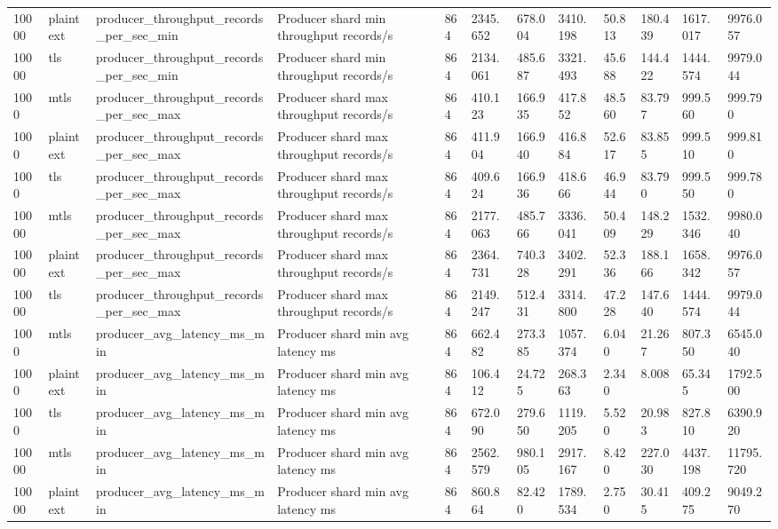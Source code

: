 \begin{longtable}{llllllllllll}
10000 & plaintext & producer\_throughput\_records\_per\_sec\_min & Producer shard min throughput records/s & 864 & 2345.652 & 678.004 & 3410.198 & 50.813 & 180.439 & 1617.017 & 9976.057 \\
10000 & tls & producer\_throughput\_records\_per\_sec\_min & Producer shard min throughput records/s & 864 & 2134.061 & 485.687 & 3321.493 & 45.688 & 144.422 & 1444.574 & 9979.044 \\
1000 & mtls & producer\_throughput\_records\_per\_sec\_max & Producer shard max throughput records/s & 864 & 410.123 & 166.935 & 417.852 & 48.560 & 83.797 & 999.560 & 999.790 \\
1000 & plaintext & producer\_throughput\_records\_per\_sec\_max & Producer shard max throughput records/s & 864 & 411.904 & 166.940 & 416.884 & 52.617 & 83.855 & 999.510 & 999.810 \\
1000 & tls & producer\_throughput\_records\_per\_sec\_max & Producer shard max throughput records/s & 864 & 409.624 & 166.936 & 418.666 & 46.944 & 83.790 & 999.550 & 999.780 \\
10000 & mtls & producer\_throughput\_records\_per\_sec\_max & Producer shard max throughput records/s & 864 & 2177.063 & 485.766 & 3336.041 & 50.409 & 148.229 & 1532.346 & 9980.040 \\
10000 & plaintext & producer\_throughput\_records\_per\_sec\_max & Producer shard max throughput records/s & 864 & 2364.731 & 740.328 & 3402.291 & 52.336 & 188.166 & 1658.342 & 9976.057 \\
10000 & tls & producer\_throughput\_records\_per\_sec\_max & Producer shard max throughput records/s & 864 & 2149.247 & 512.431 & 3314.800 & 47.228 & 147.640 & 1444.574 & 9979.044 \\
1000 & mtls & producer\_avg\_latency\_ms\_min & Producer shard min avg latency ms & 864 & 662.482 & 273.385 & 1057.374 & 6.040 & 21.267 & 807.350 & 6545.040 \\
1000 & plaintext & producer\_avg\_latency\_ms\_min & Producer shard min avg latency ms & 864 & 106.412 & 24.725 & 268.363 & 2.340 & 8.008 & 65.345 & 1792.500 \\
1000 & tls & producer\_avg\_latency\_ms\_min & Producer shard min avg latency ms & 864 & 672.090 & 279.650 & 1119.205 & 5.520 & 20.983 & 827.810 & 6390.920 \\
10000 & mtls & producer\_avg\_latency\_ms\_min & Producer shard min avg latency ms & 864 & 2562.579 & 980.105 & 2917.167 & 8.420 & 227.030 & 4437.198 & 11795.720 \\
10000 & plaintext & producer\_avg\_latency\_ms\_min & Producer shard min avg latency ms & 864 & 860.864 & 82.420 & 1789.534 & 2.750 & 30.415 & 409.275 & 9049.270 \\

\end{longtable}
